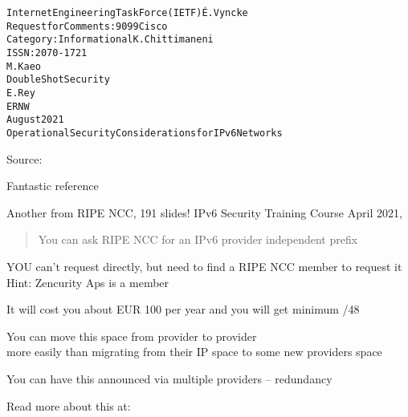 \documentclass[Screen16to9,17pt]{foils}
\begin{document}

\begin{alltt}\small
Internet Engineering Task Force (IETF)                         É. Vyncke
Request for Comments: 9099                                         Cisco
Category: Informational                                  K. Chittimaneni
ISSN: 2070-1721
                                                                 M. Kaeo
                                                    Double Shot Security
                                                                  E. Rey
                                                                    ERNW
                                                             August 2021
         Operational Security Considerations for IPv6 Networks
\end{alltt}
Source: 

\begin{list2}
\item Fantastic reference
\item Another from RIPE NCC, 191 slides! IPv6 Security Training Course April 2021,\\
\end{list2}




\begin{quote}
You can ask RIPE NCC for an IPv6 provider independent prefix
\end{quote}

\begin{list2}
\item YOU can't request directly, but need to find a RIPE NCC member to request it\\
Hint: Zencurity Aps is a member
\item It will cost you about EUR 100 per year and you will get minimum /48
\item You can move this space from provider to provider\\
more easily than migrating from their IP space to some new providers space
\item You can have this announced via multiple providers -- redundancy
\item Read more about this at:\\
\end{list2}
\end{document}
